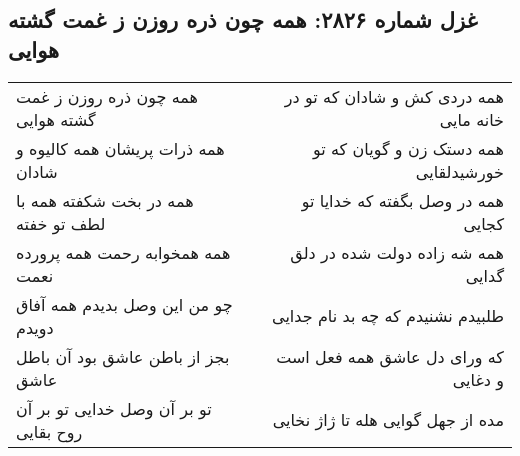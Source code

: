 \begin{center}
\section*{غزل شماره ۲۸۲۶: همه چون ذره روزن ز غمت گشته هوایی}
\label{sec:2826}
\begin{longtable}{l p{0.5cm} r}
همه چون ذره روزن ز غمت گشته هوایی
&&
همه دردی کش و شادان که تو در خانه مایی
\\
همه ذرات پریشان همه کالیوه و شادان
&&
همه دستک زن و گویان که تو خورشیدلقایی
\\
همه در بخت شکفته همه با لطف تو خفته
&&
همه در وصل بگفته که خدایا تو کجایی
\\
همه همخوابه رحمت همه پرورده نعمت
&&
همه شه زاده دولت شده در دلق گدایی
\\
چو من این وصل بدیدم همه آفاق دویدم
&&
طلبیدم نشنیدم که چه بد نام جدایی
\\
بجز از باطن عاشق بود آن باطل عاشق
&&
که ورای دل عاشق همه فعل است و دغایی
\\
تو بر آن وصل خدایی تو بر آن روح بقایی
&&
مده از جهل گوایی هله تا ژاژ نخایی
\\
\end{longtable}
\end{center}
